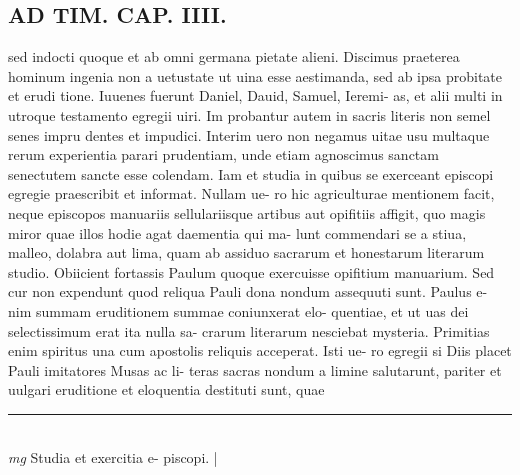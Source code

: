 \documentclass{article}
\begin{document}
\begin{pages}
\section*{AD TIM. CAP. IIII. }
\marginpar{[ p.145 ]}\pstart sed indocti quoque et ab omni germana pietate alieni. Discimus praeterea hominum ingenia non a uetustate ut uina esse aestimanda, sed ab ipsa probitate et erudi tione. Iuuenes fuerunt Daniel, Dauid, Samuel, Ieremi- as, et alii multi in utroque testamento egregii uiri. Im probantur autem in sacris literis non semel senes impru dentes et impudici. Interim uero non negamus uitae usu multaque rerum experientia parari prudentiam, unde etiam agnoscimus sanctam senectutem sancte esse colendam. Iam et studia in quibus se exerceant episcopi egregie praescribit et informat. Nullam ue- ro hic agriculturae mentionem facit, neque episcopos manuariis sellulariisque artibus aut opifitiis affigit, quo magis miror quae illos hodie agat daementia qui ma- lunt commendari se a stiua, malleo, dolabra aut lima, quam ab assiduo sacrarum et honestarum literarum studio. Obiicient fortassis Paulum quoque exercuisse opifitium manuarium. Sed cur non expendunt quod reliqua Pauli dona nondum assequuti sunt. Paulus e- nim summam eruditionem summae coniunxerat elo- quentiae, et ut uas dei selectissimum erat ita nulla sa- crarum literarum nesciebat mysteria. Primitias enim spiritus una cum apostolis reliquis acceperat. Isti ue- ro egregii si Diis placet Pauli imitatores Musas ac li- teras sacras nondum a limine salutarunt, pariter et uulgari eruditione et eloquentia destituti sunt, quae  \pend
\vspace{0.5cm}\noindent
\vspace{0.2cm}\rule{1cm}{0.2pt}\\ 
\hspace{0.2cm}\textit{mg}
\footnotesize Studia et exercitia e- piscopi. 
\normalsize| 

\end{pages}
\end{document}

